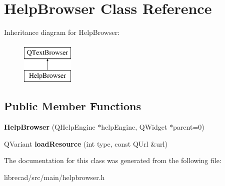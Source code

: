 \hypertarget{classHelpBrowser}{\section{Help\-Browser Class Reference}
\label{classHelpBrowser}
}
Inheritance diagram for Help\-Browser\-:\begin{figure}[H]
\begin{center}
\leavevmode
\includegraphics[height=2.000000cm]{classHelpBrowser}
\end{center}
\end{figure}
\subsection*{Public Member Functions}
\begin{DoxyCompactItemize}
\item 
\hypertarget{classHelpBrowser_a275fb39ea7346e6019c1892d5daa02cd}{{\bfseries Help\-Browser} (Q\-Help\-Engine $\ast$help\-Engine, Q\-Widget $\ast$parent=0)}\label{classHelpBrowser_a275fb39ea7346e6019c1892d5daa02cd}

\item 
\hypertarget{classHelpBrowser_a105002319d8e4a5803e6986ba3b8a06c}{Q\-Variant {\bfseries load\-Resource} (int type, const Q\-Url \&url)}\label{classHelpBrowser_a105002319d8e4a5803e6986ba3b8a06c}

\end{DoxyCompactItemize}


The documentation for this class was generated from the following file\-:\begin{DoxyCompactItemize}
\item 
librecad/src/main/helpbrowser.\-h\end{DoxyCompactItemize}
